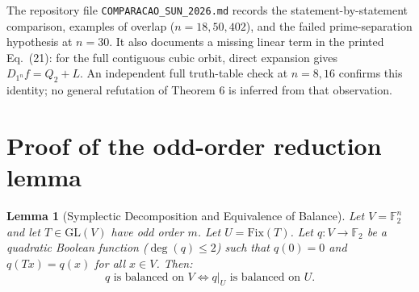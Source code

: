 \documentclass[11pt,a4paper]{article}
\newtheorem{lemma}[theorem]{Lemma}
\theoremstyle{definition}
\newcommand{\F}{\mathbb{F}_2}
\begin{document}
The repository file \texttt{COMPARACAO\_SUN\_2026.md} records the statement-by-statement comparison, examples of overlap ($n=18,50,402$), and the failed prime-separation hypothesis at $n=30$. It also documents a missing linear term in the printed Eq.~(21): for the full contiguous cubic orbit, direct expansion gives $D_{1^n}f=Q_2+L$. An independent full truth-table check at $n=8,16$ confirms this identity; no general refutation of Theorem 6 is inferred from that observation.

\section{Proof of the odd-order reduction lemma}

\begin{lemma}[Symplectic Decomposition and Equivalence of Balance]
Let $V = \F^n$ and let $T \in \mathrm{GL}(V)$ have odd order $m$. Let $U = \mathrm{Fix}(T)$. Let $q: V \to \F$ be a quadratic Boolean function ($\deg(q) \le 2$) such that $q(0) = 0$ and $q(Tx) = q(x)$ for all $x \in V$. Then:
\begin{equation}
q \text{ is balanced on } V \iff q|_U \text{ is balanced on } U.
\end{equation}
\end{lemma}
\end{document}
